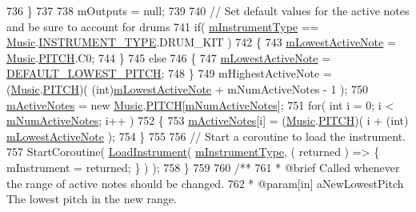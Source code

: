 \begin{DoxyCodeInclude}
736         \}
737 
738         mOutputs = null;
739 
740         \textcolor{comment}{// Set default values for the active notes and be sure to account for drums}
741         \textcolor{keywordflow}{if}( \hyperlink{group___v_i_m_priv_ga108c350257b3a2080e06cd4a8251f6a4}{mInstrumentType} == \hyperlink{class_music}{Music}.\hyperlink{group___music_enums_gabfce60192305965558a36e368ebd67c3}{INSTRUMENT\_TYPE}.DRUM\_KIT )
742         \{
743             \hyperlink{group___v_i_m_priv_ga5e3a5116e0dabb37e0ea21d73ac1567e}{mLowestActiveNote} = \hyperlink{class_music}{Music}.\hyperlink{group___music_enums_ga508f69b199ea518f935486c990edac1d}{PITCH}.C0;
744         \}
745         \textcolor{keywordflow}{else}
746         \{
747             \hyperlink{group___v_i_m_priv_ga5e3a5116e0dabb37e0ea21d73ac1567e}{mLowestActiveNote} = \hyperlink{group___v_i_m_const_ga0ae09555ae6bc8a04110599510a0d77d}{DEFAULT\_LOWEST\_PITCH};
748         \}
749         mHighestActiveNote = (\hyperlink{class_music}{Music}.\hyperlink{group___music_enums_ga508f69b199ea518f935486c990edac1d}{PITCH})( (\textcolor{keywordtype}{int})\hyperlink{group___v_i_m_priv_ga5e3a5116e0dabb37e0ea21d73ac1567e}{mLowestActiveNote} + 
      mNumActiveNotes - 1 );
750         \hyperlink{group___v_i_m_priv_ga5cedf9995d59b416412677e6004b659c}{mActiveNotes} = \textcolor{keyword}{new} \hyperlink{class_music}{Music}.\hyperlink{group___music_enums_ga508f69b199ea518f935486c990edac1d}{PITCH}[\hyperlink{group___v_i_m_priv_ga0f7e11945763c48057be326b661dfdaf}{mNumActiveNotes}];
751         \textcolor{keywordflow}{for}( \textcolor{keywordtype}{int} i = 0; i < \hyperlink{group___v_i_m_priv_ga0f7e11945763c48057be326b661dfdaf}{mNumActiveNotes}; i++ )
752         \{
753             \hyperlink{group___v_i_m_priv_ga5cedf9995d59b416412677e6004b659c}{mActiveNotes}[i] = (\hyperlink{class_music}{Music}.\hyperlink{group___music_enums_ga508f69b199ea518f935486c990edac1d}{PITCH})( i + (\textcolor{keywordtype}{int})
      \hyperlink{group___v_i_m_priv_ga5e3a5116e0dabb37e0ea21d73ac1567e}{mLowestActiveNote} );
754         \}
755 
756         \textcolor{comment}{// Start a coroutine to load the instrument.}
757         StartCoroutine( \hyperlink{group___v_i_m_coroutines_gab8082c1cc590771bf57da8b5ae8603d1}{LoadInstrument}( \hyperlink{group___v_i_m_priv_ga108c350257b3a2080e06cd4a8251f6a4}{mInstrumentType}, ( returned ) => \{ 
      mInstrument = returned; \} ) );
758     \}
759 \textcolor{comment}{}
760 \textcolor{comment}{    /**}
761 \textcolor{comment}{     * @brief Called whenever the range of active notes should be changed.}
762 \textcolor{comment}{     * @param[in] aNewLowestPitch The lowest pitch in the new range.}

\end{DoxyCodeInclude}
